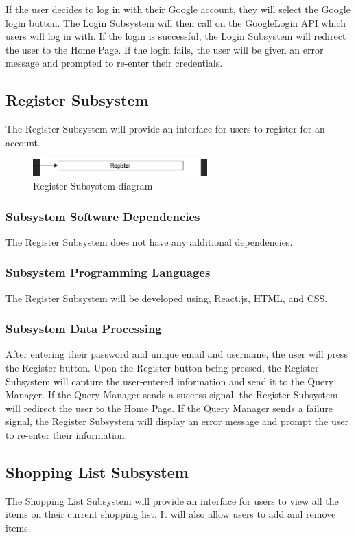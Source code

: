 If the user decides to log in with their Google account, they will select the Google login button. The Login Subsystem will then call on the GoogleLogin API which users will log in with. If the login is successful, the Login Subsystem will redirect the user to the Home Page. If the login fails, the user will be given an error message and prompted to re-enter their credentials.

\subsection{Register Subsystem}
The Register Subsystem will provide an interface for users to register for an account.

\begin{figure}[h!]
	\centering
 	\includegraphics[width=0.60\textwidth]{images/register}
 \caption{Register Subsystem diagram}
\end{figure}

\subsubsection{Subsystem Software Dependencies}
The Register Subsystem does not have any additional dependencies.

\subsubsection{Subsystem Programming Languages}
The Register Subsystem will be developed using, React.js, HTML, and CSS.

\subsubsection{Subsystem Data Processing}
After entering their password and unique email and username, the user will press the Register button. Upon the Register button being pressed, the Register Subsystem will capture the user-entered information and send it to the Query Manager. If the Query Manager sends a success signal, the Register Subsystem will redirect the user to the Home Page. If the Query Manager sends a failure signal, the Register Subsystem will display an error message and prompt the user to re-enter their information.

\subsection{Shopping List Subsystem}
The Shopping List Subsystem will provide an interface for users to view all the items on their current shopping list. It will also allow users to add and remove items.

